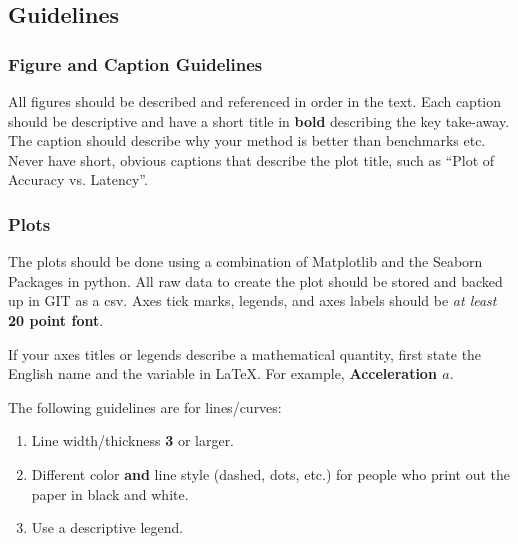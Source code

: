 \subsection{Guidelines}

\subsubsection{Figure and Caption Guidelines}

All figures should be described and referenced in order in the text. 
Each caption should be descriptive and have a short title in \textbf{bold} describing the key take-away. The caption should describe why your method is better than benchmarks etc. Never have short, obvious captions that describe the plot title, such as ``Plot of Accuracy vs. Latency''.

\subsubsection{Plots}

The plots should be done using a combination of Matplotlib and the Seaborn Packages in python. All raw data to create the plot should be stored and backed up in GIT as a csv. Axes tick marks, legends, and axes labels should be \textit{at least} \textbf{20 point font}.

If your axes titles or legends describe a mathematical quantity, first state the English name and the variable in LaTeX. For example, \textbf{Acceleration $a$}.

The following guidelines are for lines/curves:

\begin{enumerate}
    \item Line width/thickness \textbf{3} or larger.
    \item Different color \textbf{and} line style (dashed, dots, etc.) for people who print out the paper in black and white.
    \item Use a descriptive legend.
\end{enumerate}

